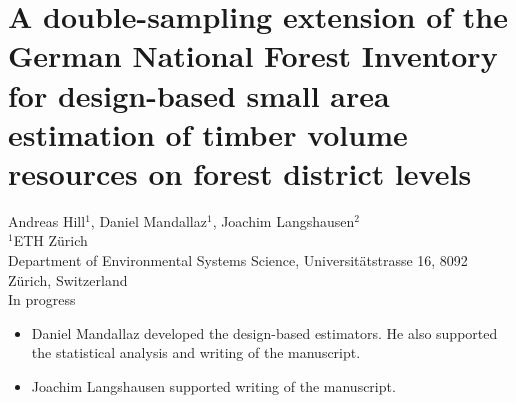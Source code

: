 \chapter{A double-sampling extension of the German National Forest Inventory for design-based small area estimation of timber volume resources on forest district levels}
\label{chap:regmod}
{\large Andreas Hill$^1$, Daniel Mandallaz$^1$, Joachim Langshausen$^2$}\\

\vspace{3cm}
\noindent
$^1$ETH Z\"urich\\Department of Environmental Systems Science, Universit\"atstrasse 16, 8092 Z\"urich, Switzerland \\

\vspace{\fill}
\noindent
In progress

\newpage
\renewcommand{\labelitemi}{--}
\begin{itemize}
	\item Daniel Mandallaz developed the design-based estimators. He also supported the statistical analysis and writing of the manuscript.
	\item Joachim Langshausen supported writing of the manuscript.
\end{itemize}

\clearpage